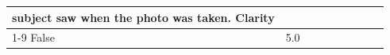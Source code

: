 \begin{table}[H]
\begin{tabular}{lllrlllll}
subject saw when the photo was taken. Clarity \\
\cline{1-9}
False & 5.0%

\end{tabular}
\end{table}
